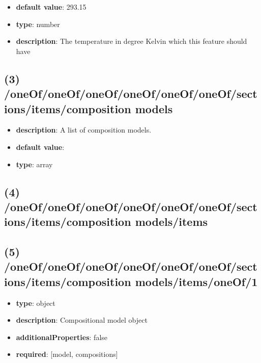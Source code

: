 \begin{itemize}[leftmargin=6em]\item {\bf default value}: 293.15
\item {\bf type}: number
\item {\bf description}: The temperature in degree Kelvin which this feature should have
\end{itemize}\subsection{(3) /oneOf/oneOf/oneOf/oneOf/oneOf/oneOf/sections/items/composition models}
\begin{itemize}[leftmargin=3em]\item {\bf description}: A list of composition models.
\item {\bf default value}: 
\item {\bf type}: array
\end{itemize}\subsection{(4) /oneOf/oneOf/oneOf/oneOf/oneOf/oneOf/sections/items/composition models/items}

\subsection{(5) /oneOf/oneOf/oneOf/oneOf/oneOf/oneOf/sections/items/composition models/items/oneOf/1}
\begin{itemize}[leftmargin=5em]\item {\bf type}: object
\item {\bf description}: Compositional model object
\item {\bf additionalProperties}: false
\item {\bf required}: [model, compositions]\end{itemize}
